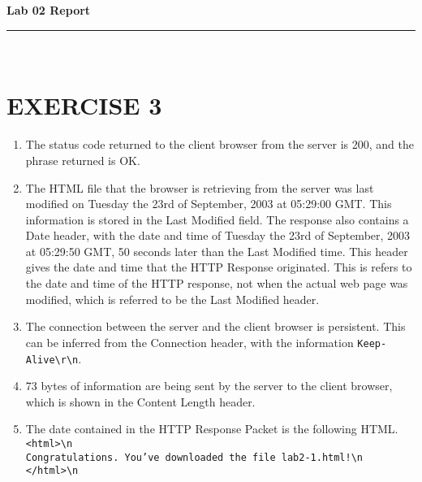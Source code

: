 \documentclass[a4paper,11pt]{article}
\newcommand{\code}{\texttt}
\newcommand{\HRule}{\rule{\linewidth}{0.5mm}} %
\begin{document}
\begin{center}
	\LARGE \textbf{Lab 02 Report}
	\HRule\\
\end{center}



\section{EXERCISE 3}
\begin{enumerate}[leftmargin=*]
	\item The status code returned to the client browser from the server is 200, and the phrase returned is OK.
	\item The HTML file that the browser is retrieving from the server was last modified on Tuesday the 23rd of September, 2003 at 05:29:00 GMT. This information is stored in the Last Modified field. The response also contains a Date header, with the date and time of Tuesday the 23rd of September, 2003 at 05:29:50 GMT, 50 seconds later than the Last Modified time. This header gives the date and time that the HTTP Response originated. This is refers to the date and time of the HTTP response, not when the actual web page was modified, which is referred to be the Last Modified header.
	\item The connection between the server and the client browser is persistent. This can be inferred from the Connection header, with the information \code{Keep-Alive\textbackslash{r}\textbackslash{n}}.
	\item 73 bytes of information are being sent by the server to the client browser, which is shown in the Content Length header.
	\item The date contained in the HTTP Response Packet is the following HTML.\\
		\code{<html>\textbackslash{n}\\
			Congratulations. You've downloaded the file lab2-1.html!\textbackslash{n}\\
		</html>\textbackslash{n}\\}
\end{enumerate}
\end{document}
